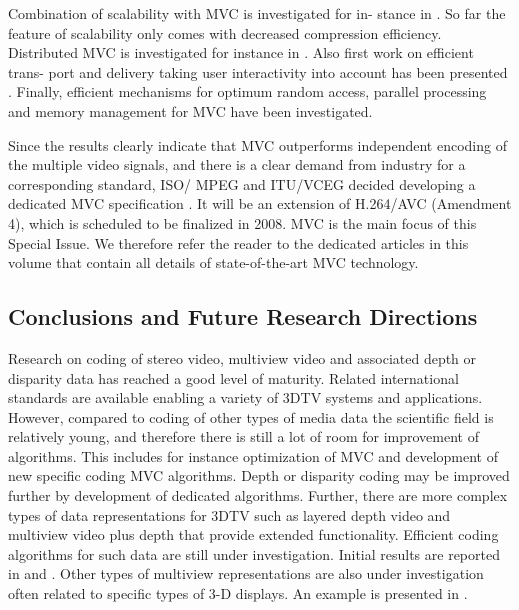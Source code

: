 Combination of scalability with MVC is investigated for in- stance in . So far the feature of scalability only comes with decreased compression efficiency. Distributed MVC is investigated for instance in . Also first work on efficient trans- port and delivery taking user interactivity into account has been presented . Finally, efficient mechanisms for optimum random access, parallel processing and memory management for MVC have been investigated.

Since the results clearly indicate that MVC outperforms independent encoding of the multiple video signals, and there is a clear demand from industry for a corresponding standard, ISO/ MPEG and ITU/VCEG decided developing a dedicated MVC specification . It will be an extension of H.264/AVC (Amendment 4), which is scheduled to be finalized in 2008. MVC is the main focus of this Special Issue. We therefore refer the reader to the dedicated articles in this volume that contain all details of state-of-the-art MVC technology.

\subsection{Conclusions and Future Research Directions}

Research on coding of stereo video, multiview video and associated depth or disparity data has reached a good level of maturity. Related international standards are available enabling a variety of 3DTV systems and applications. However, compared to coding of other types of media data the scientific field is relatively young, and therefore there is still a lot of room for improvement of algorithms. This includes for instance optimization of MVC and development of new specific coding MVC algorithms. Depth or disparity coding may be improved further by development of dedicated algorithms. Further, there are more complex types of data representations for 3DTV such as layered depth video and multiview video plus depth that provide extended functionality. Efficient coding algorithms for such data are still under investigation. Initial results are reported in  and . Other types of multiview representations are also under investigation often related to specific types of 3-D displays. An example is presented in .

